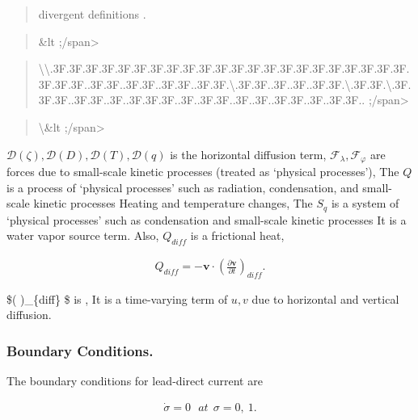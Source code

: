 \begin{quote}
\protect\hypertarget{divergentux20definitions}{}{\blaze{[}divergent
definitions }.
\end{quote}

\begin{quote}
\&lt ;/span\textgreater{}
\end{quote}

\begin{quote}
\textbackslash\textbackslash.3F.3F.3F.3F.3F.3F.3F.3F.3F.3F.3F.3F.3F.3F.3F.3F.3F.3F.3F.3F.3F.3F.3F.3F.3F..3F.3F..3F.3F..3F.3F..3F.3F.\textbackslash.3F.3F..3F..3F..3F.3F.\textbackslash.3F.3F.\textbackslash.3F.3F.3F..3F.3F..3F..3F.3F.3F..3F..3F.3F..3F..3F..3F.3F..3F..3F.3F..
;/span\textgreater{}
\end{quote}

\begin{quote}
\textbackslash{}\lopen[E section]\&lt ;/span\textgreater{}
\end{quote}

\({\mathcal D}(\zeta), {\mathcal D}(D), {\mathcal D}(T), {\mathcal D}(q)\)
is the horizontal diffusion term,
\({\mathcal F}_\lambda, {\mathcal F}_\varphi\) are forces due to
small-scale kinetic processes (treated as `physical processes'), The
\(Q\) is a process of `physical processes' such as radiation,
condensation, and small-scale kinetic processes Heating and temperature
changes, The \(S_q\) is a system of `physical processes' such as
condensation and small-scale kinetic processes It is a water vapor
source term. Also, \(Q_{diff}\) is a frictional heat,

\begin{eqnarray}
  Q_{diff}
 = - \mathbf{v} \cdot  ( \frac{\partial \mathbf{v}}{\partial t} )_{diff} .
\end{eqnarray}

\$(  )\_\{diff\} \$ is , It is a
time-varying term of \(u,v\) due to horizontal and vertical diffusion.

\hypertarget{boundary-conditions.}{%
\subsubsection{Boundary Conditions.}\label{boundary-conditions.}}

The boundary conditions for lead-direct current are

\begin{eqnarray}
  \dot{\sigma} = 0  \ \ \ at \ \ \sigma = 0 , \ 1 .
\end{eqnarray}

